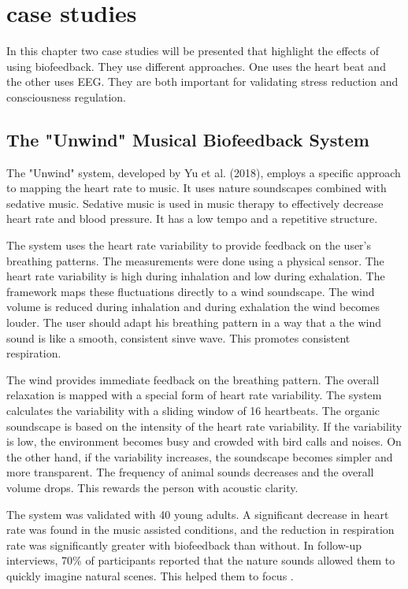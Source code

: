 \section{case studies}

In this chapter two case studies will be presented that highlight the effects of using biofeedback. They use different approaches. One uses the heart beat and the other uses EEG. They are both important for validating stress reduction and consciousness regulation.

\subsection{The "Unwind" Musical Biofeedback System}

The "Unwind" system, developed by Yu et al. (2018), employs a specific approach to mapping the heart rate to music. It uses nature soundscapes combined with sedative music. Sedative music is used in music therapy to effectively decrease heart rate and blood pressure. It has a low tempo and a repetitive structure\cite{yu2018unwind}.

The system uses the heart rate variability to provide feedback on the user's breathing patterns. The measurements were done using a physical sensor. The heart rate variability is high during inhalation and low during exhalation. The framework maps these fluctuations directly to a wind soundscape. The wind volume is reduced during inhalation and during exhalation the wind becomes louder. The user should adapt his breathing pattern in a way that a the wind sound is like a smooth, consistent sinve wave. This promotes consistent respiration\cite{yu2018unwind}.

The wind provides immediate feedback on the breathing pattern. The overall relaxation is mapped with a special form of heart rate variability. The system calculates the variability with a sliding window of 16 heartbeats. The organic soundscape is based on the intensity of the heart rate variability. If the variability is low, the environment becomes busy and crowded with bird calls and noises. On the other hand, if the variability increases, the soundscape becomes simpler and more transparent. The frequency of animal sounds decreases and the overall volume drops. This rewards the person with acoustic clarity\cite{yu2018unwind}.

The system was validated with 40 young adults. A significant decrease in heart rate was found in the music assisted conditions, and the reduction in respiration rate was significantly greater with biofeedback than without. In follow-up interviews, 70\% of participants reported that the nature sounds allowed them to quickly imagine natural scenes. This helped them to focus \cite{yu2018unwind}.

